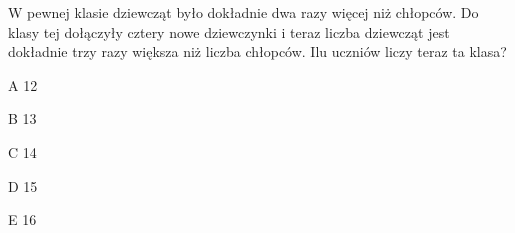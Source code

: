 \begin{tresc}
W pewnej klasie dziewcząt było dokładnie dwa razy więcej niż chłopców. Do klasy tej dołączyły cztery nowe dziewczynki i teraz liczba dziewcząt jest dokładnie trzy razy większa niż liczba chłopców. Ilu uczniów liczy teraz ta klasa?
\end{tresc}
\begin{wariant}{A} 12 \end{wariant}
\begin{wariant}{B} 13 \end{wariant}
\begin{wariant}{C} 14 \end{wariant}
\begin{wariant}{D} 15 \end{wariant}
\begin{wariant}{E} 16 \end{wariant}
